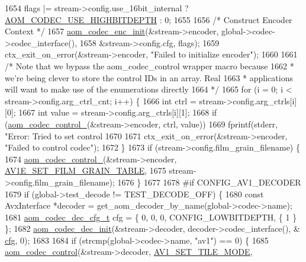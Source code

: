 \begin{DoxyCodeInclude}
{{{{{{{{{{{{{{{{{{{{{{{{{{{{{{{{{{{{1654   flags |= stream->config.use\_16bit\_internal ? \hyperlink{group__encoder_gae30bbbdef18e9da3631b69c170533e92}{AOM\_CODEC\_USE\_HIGHBITDEPTH} : 0;
1655 
1656   \textcolor{comment}{/* Construct Encoder Context */}
1657   \hyperlink{group__encoder_gaade68a7d33d30f97dc9a596aa5e065d8}{aom\_codec\_enc\_init}(&stream->encoder, global->codec->codec\_interface(),
1658       &stream->config.cfg, flags);
1659   ctx\_exit\_on\_error(&stream->encoder, \textcolor{stringliteral}{"Failed to initialize encoder"});
1660 
1661   \textcolor{comment}{/* Note that we bypass the aom\_codec\_control wrapper macro because}
1662 \textcolor{comment}{   * we're being clever to store the control IDs in an array. Real}
1663 \textcolor{comment}{   * applications will want to make use of the enumerations directly}
1664 \textcolor{comment}{   */}
1665   \textcolor{keywordflow}{for} (i = 0; i < stream->config.arg\_ctrl\_cnt; i++) \{
1666     \textcolor{keywordtype}{int} ctrl = stream->config.arg\_ctrls[i][0];
1667     \textcolor{keywordtype}{int} value = stream->config.arg\_ctrls[i][1];
1668     \textcolor{keywordflow}{if} (\hyperlink{group__codec_ga51eb332a40dcacc39000ab8e0be36b79}{aom\_codec\_control\_}(&stream->encoder, ctrl, value))
1669       fprintf(stderr, \textcolor{stringliteral}{"Error: Tried to set control %
1670 
1671     ctx\_exit\_on\_error(&stream->encoder, \textcolor{stringliteral}{"Failed to control codec"});
1672   \}
1673   \textcolor{keywordflow}{if} (stream->config.film\_grain\_filename) \{
1674     \hyperlink{group__codec_ga51eb332a40dcacc39000ab8e0be36b79}{aom\_codec\_control\_}(&stream->encoder, 
      \hyperlink{group__aom__encoder_ggae78dde67a6d78f332e9bdba0dde42db5ad5846c6f49d37e65a03c39e68d487097}{AV1E\_SET\_FILM\_GRAIN\_TABLE},
1675         stream->config.film\_grain\_filename);
1676   \}
1677 
1678 \textcolor{preprocessor}{#if CONFIG\_AV1\_DECODER}
1679   \textcolor{keywordflow}{if} (global->test\_decode != TEST\_DECODE\_OFF) \{
1680     \textcolor{keyword}{const} AvxInterface *decoder = get\_aom\_decoder\_by\_name(global->codec->name);
1681     \hyperlink{structaom__codec__dec__cfg}{aom\_codec\_dec\_cfg\_t} cfg = \{ 0, 0, 0, CONFIG\_LOWBITDEPTH, \{ 1 \} \};
1682     \hyperlink{group__decoder_gafdbfca65b19ab1f6d72b32cd01753b9b}{aom\_codec\_dec\_init}(&stream->decoder, decoder->codec\_interface(), &
      \hyperlink{structaom__codec__enc__cfg_a91c4b8e91211a9cea98a8003ef2e4e65}{cfg}, 0);
1683 
1684     \textcolor{keywordflow}{if} (strcmp(global->codec->name, \textcolor{stringliteral}{"av1"}) == 0) \{
1685       \hyperlink{group__codec_ga6da974f4eeaba1fa74106b28d0fe6ac5}{aom\_codec\_control}(&stream->decoder, \hyperlink{group__aom__decoder_gga3865fd4b3192489baa9a5c3632ebe97ba0795d8084ae8c78528c01587198df9e2}{AV1\_SET\_TILE\_MODE},
}}}}}}}}}}}}}}}}}}}}}}}}}}}}}}}}}}}}}
\end{DoxyCodeInclude}
